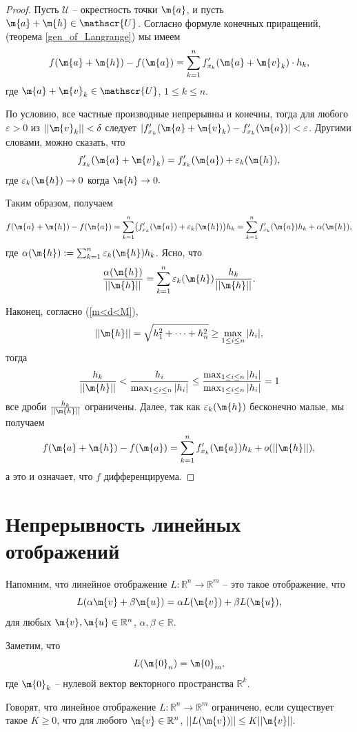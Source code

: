 \begin{proof}
    Пусть $\mathscr{U}$ -- окрестность точки $\m{a}$, и пусть $\m{a} + \m{h} \in \mathscr{U}$. Согласно формуле конечных приращений, (теорема \ref{gen_of_Langrange}) мы имеем
    \[
     f(\m{a} + \m{h}) - f(\m{a}) = \sum_{k=1}^n  f'_{x_k}({\m{a} + \m{v}_k})\cdot h_k,
    \]
    где $\m{a} + \m{v}_k \in \mathscr{U}$, $1 \le k \le n$.

    По условию, все частные производные непрерывны и конечны, тогда для любого $\varepsilon >0$ из $||\m{v}_k|| < \delta$ следует $|f'_{x_k}({\m{a} + \m{v}_k}) - f'_{x_k}(\m{a})| < \varepsilon$. Другими словами, можно сказать, что
    \[
     f'_{x_k}({\m{a} + \m{v}_k}) = f_{x_k}'(\m{a}) + \varepsilon_k(\m{h}),
    \]
    где $\varepsilon_k(\m{h}) \to 0$ когда $\m{h} \to 0.$

    Таким образом, получаем
    \[
    f(\m{a} + \m{h}) - f(\m{a}) = \sum_{k=1}^n \bigl( f'_{x_k}(\m{a}) + \varepsilon_k(\m{h})  \bigr)h_k = \sum_{k=1}^n f'_{x_k}(\m{a}) h_k + \alpha(\m{h}),
    \]
    где $\alpha(\m{h}): = \sum_{k=1}^n \varepsilon_k(\m{h}) h_k$. Ясно, что
    \[
     \frac{\alpha(\m{h})}{|| \m{h} ||} = \sum_{k=1}^n \varepsilon_k(\m{h}) \frac{h_k}{||\m{h} ||}.
    \]

Наконец, согласно (\ref{m<d<M}), 
\[
 || \m{h} || = \sqrt{h_1^2 + \cdots + h_n^2} \ge  \max_{1\le i \le n} |h_i|,
\]
тогда 
\[
\frac{h_k}{|| \m{h}||} < \frac{h_i}{ \max_{1\le i \le n} |h_i|} \le \frac{\max_{1\le i \le n} |h_i|}{\max_{1\le i \le n} |h_i|} = 1 
\]
\ie все дроби $\frac{h_k}{||\m{h}||}$ ограничены. Далее, так как $\varepsilon_k(\m{h})$ бесконечно малые, мы получаем
\[
  f(\m{a} + \m{h}) - f(\m{a}) = \sum_{k=1}^n f'_{x_k}(\m{a}) h_k + o(||\m{h}||),
\]
а это и означает, что $f$ дифференцируема.
\end{proof}

\section{Непрерывность линейных отображений}

Напомним, что линейное отображение $L: \mathbb{R}^n \to \mathbb{R}^m$ -- это такое отображение, что
\[
 L(\alpha \m{v} + \beta \m{u}) = \alpha L(\m{v}) + \beta L(\m{u}),
\]
для любых $\m{v}, \m{u} \in \mathbb{R}^n$, $\alpha,\beta \in \mathbb{R}$.

Заметим, что 
\[
 L(\m{0}_n) = \m{0}_m,
\]
где $\m{0}_k$ -- нулевой вектор векторного пространства $\mathbb{R}^k$.


\begin{definition}
    Говорят, что линейное отображение $L: \mathbb{R}^n \to \mathbb{R}^m$ ограничено, если существует такое $K \ge 0$, что для любого $\m{v} \in \mathbb{R}^n$, $|| L(\m{v}) || \le K ||\m{v}||.$
\end{definition}

